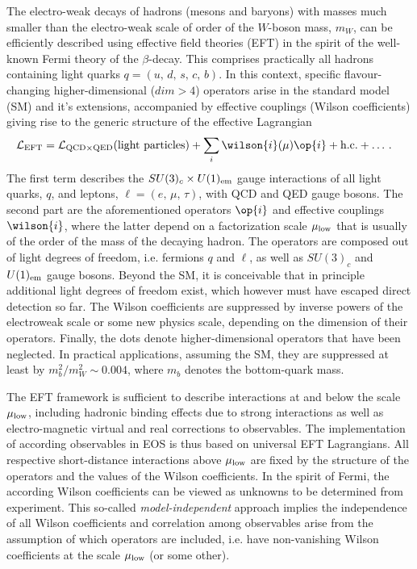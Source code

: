 The electro-weak decays of hadrons (mesons and baryons) with masses much smaller
than the electro-weak scale of order of the $W$-boson mass, $m_W$, can be efficiently
described using effective field theories (EFT) in the spirit of the well-known
Fermi theory of the $\beta$-decay. This comprises practically all hadrons containing
light quarks $q = (u,\,d,\,s,\,c,\,b)$. In this context, specific flavour-changing
higher-dimensional ($dim > 4$) operators arise in the standard model (SM) and
it's extensions, accompanied by effective couplings (Wilson coefficients) giving
rise to the generic structure of the effective Lagrangian
\begin{align}
  {\cal L}_{\rm EFT} &
  = {\cal L}_{{\rm QCD} \times {\rm QED}} (\mbox{light particles})
  + \sum_i \wilson{i}(\mu) \op{i} + \mbox{h.c.} + \ldots \,.
\end{align} 
The first term describes the $SU(3)_c \times U(1)_{\rm em}$
gauge interactions of all light quarks, $q$, and leptons, $\ell = (e,\,\mu,\,\tau)$,
with QCD and QED gauge bosons. The second part are the aforementioned operators
$\op{i}$ and effective couplings $\wilson{i}$, where the latter depend on a
factorization scale $\mu_{\rm low}$ that is usually of the order of the mass of the
decaying hadron. The operators are composed out of light degrees of freedom, i.e. fermions
$q$ and $\ell$, as well as $SU(3)_c$ and $U(1)_{\rm em}$ gauge bosons. Beyond
the SM, it is conceivable that in principle additional light degrees of freedom
exist, which however must have escaped direct detection so far.
The Wilson coefficients are suppressed by inverse powers of the electroweak
scale or some new physics scale, depending on the dimension of their operators.
Finally, the dots denote higher-dimensional operators that have been neglected.
In practical applications, assuming the SM, they are suppressed at least by
$m_b^2/m_W^2 \sim 0.004$, where $m_b$ denotes the bottom-quark mass.

The EFT framework is sufficient to describe interactions at and below the scale
$\mu_{\rm low}$, including hadronic binding effects due to strong interactions
as well as electro-magnetic virtual and real corrections to observables. The
implementation of according observables in EOS is thus based on universal EFT 
Lagrangians. All respective short-distance interactions above $\mu_{\rm low}$ are
fixed by the structure of the operators and the values of the Wilson coefficients.
In the spirit of Fermi, the according Wilson coefficients can be viewed as unknowns
to be determined from experiment. This so-called {\em model-independent} approach
implies the independence of all Wilson coefficients and correlation among observables
arise from the assumption of which operators are included, i.e. have non-vanishing
Wilson coefficients at the scale $\mu_{\rm low}$ (or some other). 

